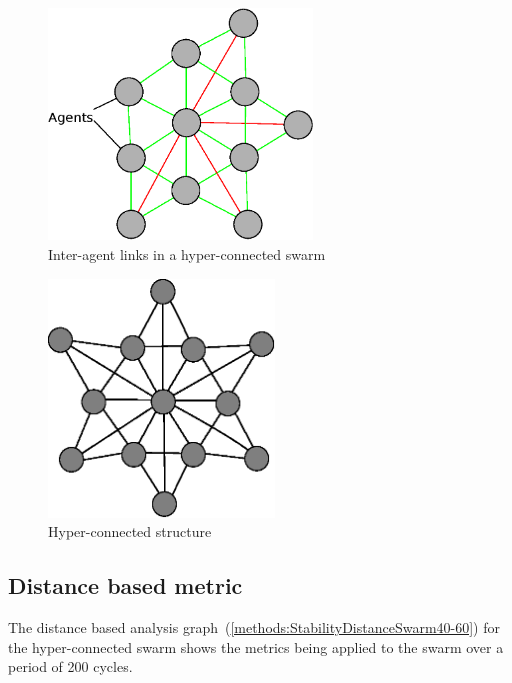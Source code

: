 \begin{figure}[H]
\begin{center}
\includegraphics[width=7cm]{CHAPTER-5/figures/CrushedStability}
\end{center}
\caption{Inter-agent links in a hyper-connected swarm} \label{methods:CrushedStability1}
\end{figure}

\begin{figure}[H]
\begin{center}
\includegraphics[width=6cm]{CHAPTER-5/figures/StableFormsCompressed}
\end{center}
\caption{Hyper-connected structure} \label{methods:StableSwarmCompressed}
\end{figure}

\subsection{Distance based metric}
The distance based analysis graph~(\autoref{methods:StabilityDistanceSwarm40-60}) for the hyper-connected swarm shows the metrics being applied to the swarm over a period of 200 cycles. 

